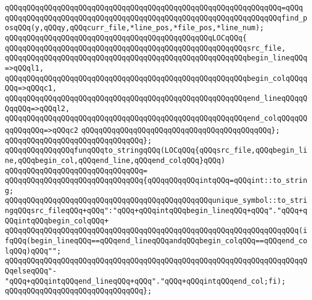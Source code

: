 \verb|qQQqqQQqqQQqqQQqqQQqqQQqqQQqqQQqqQQqqQQqqQQqqQQqqQQqqQQqqQQqqQQq=qQQq|\newline
\verb|qQQqqQQqqQQqqQQqqQQqqQQqqQQqqQQqqQQqqQQqqQQqqQQqqQQqqQQqqQQqqQQqfind_posqQQq(y,qQQqy,qQQqcurr_file,*line_pos,*file_pos,*line_num);|\newline
\newline
\verb|qQQqqQQqqQQqqQQqqQQqqQQqqQQqqQQqqQQqqQQqqQQqqQQqLOCqQQq{|\newline
\verb|qQQqqQQqqQQqqQQqqQQqqQQqqQQqqQQqqQQqqQQqqQQqqQQqqQQqqQQqsrc_file,|\newline
\verb|qQQqqQQqqQQqqQQqqQQqqQQqqQQqqQQqqQQqqQQqqQQqqQQqqQQqqQQqbegin_lineqQQq=>qQQql1,|\newline
\verb|qQQqqQQqqQQqqQQqqQQqqQQqqQQqqQQqqQQqqQQqqQQqqQQqqQQqqQQqbegin_colqQQqqQQq=>qQQqc1,|\newline
\verb|qQQqqQQqqQQqqQQqqQQqqQQqqQQqqQQqqQQqqQQqqQQqqQQqqQQqqQQqend_lineqQQqqQQqqQQq=>qQQql2,|\newline
\verb|qQQqqQQqqQQqqQQqqQQqqQQqqQQqqQQqqQQqqQQqqQQqqQQqqQQqqQQqend_colqQQqqQQqqQQqqQQq=>qQQqc2|\newline
\verb|qQQqqQQqqQQqqQQqqQQqqQQqqQQqqQQqqQQqqQQqqQQq};|\newline
\verb|qQQqqQQqqQQqqQQqqQQqqQQqqQQqqQQq};|\newline
\newline
\verb|qQQqqQQqqQQqqQQqfunqQQqto_stringqQQq(LOCqQQq{qQQqsrc_file,qQQqbegin_line,qQQqbegin_col,qQQqend_line,qQQqend_colqQQq}qQQq)|\newline
\verb|qQQqqQQqqQQqqQQqqQQqqQQqqQQqqQQq=|\newline
\verb|qQQqqQQqqQQqqQQqqQQqqQQqqQQqqQQq{qQQqqQQqqQQqintqQQq=qQQqint::to_string;|\newline
\newline
\verb|qQQqqQQqqQQqqQQqqQQqqQQqqQQqqQQqqQQqqQQqqQQqqQQqunique_symbol::to_stringqQQqsrc_fileqQQq+qQQq":"qQQq+qQQqintqQQqbegin_lineqQQq+qQQq"."qQQq+qQQqintqQQqbegin_colqQQq+|\newline
\verb|qQQqqQQqqQQqqQQqqQQqqQQqqQQqqQQqqQQqqQQqqQQqqQQqqQQqqQQqqQQqqQQqqQQq(ifqQQq(begin_lineqQQq==qQQqend_lineqQQqandqQQqbegin_colqQQq==qQQqend_colqQQq)qQQq"";|\newline
\verb|qQQqqQQqqQQqqQQqqQQqqQQqqQQqqQQqqQQqqQQqqQQqqQQqqQQqqQQqqQQqqQQqqQQqqQQqelseqQQq"-"qQQq+qQQqintqQQqend_lineqQQq+qQQq"."qQQq+qQQqintqQQqend_col;fi);|\newline
\verb|qQQqqQQqqQQqqQQqqQQqqQQqqQQqqQQq};|\newline
\newline
